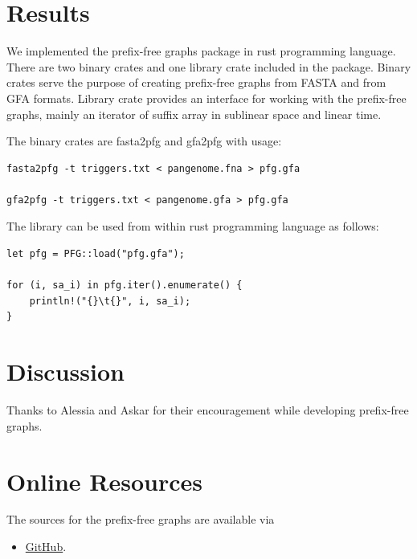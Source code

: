 \documentclass[twocolumn]{ceurart}
\begin{document}
\section{Results}
We implemented the prefix-free graphs package in rust programming language.
There are two binary crates and one library crate included in the package.
Binary crates serve the purpose of creating prefix-free graphs from FASTA and from GFA formats.
Library crate provides an interface for working with the prefix-free graphs,
mainly an iterator of suffix array in sublinear space and linear time.

The binary crates are fasta2pfg and gfa2pfg with usage:
\begin{verbatim}
fasta2pfg -t triggers.txt < pangenome.fna > pfg.gfa

gfa2pfg -t triggers.txt < pangenome.gfa > pfg.gfa
\end{verbatim}

The library can be used from within rust programming language as follows:

\begin{verbatim}
let pfg = PFG::load("pfg.gfa");

for (i, sa_i) in pfg.iter().enumerate() {
    println!("{}\t{}", i, sa_i);
}
\end{verbatim}

\section{Discussion}

\begin{acknowledgments}
    Thanks to Alessia and Askar for their encouragement while developing prefix-free graphs.
\end{acknowledgments}



\appendix

\section{Online Resources}

The sources for the prefix-free graphs are available via
\begin{itemize}
\item \href{https://github.com/andynet/pfg}{GitHub}.
\end{itemize}
\end{document}
